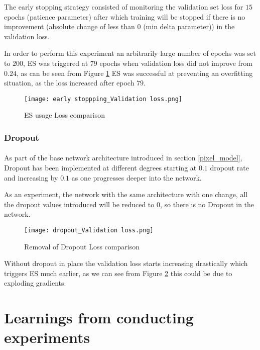 The early stopping strategy consisted of monitoring the validation set loss for $15$ epochs (patience parameter) after which training will be stopped if there is no improvement (absolute change of less than $0$ (min delta parameter)) in the validation loss.

In order to perform this experiment an arbitrarily large number of epochs was set to $200$, \gls{ES} was triggered at $79$ epochs when validation loss did not improve from $0.24$, as can be seen from Figure \ref{es_loss} \gls{ES} was successful at preventing an overfitting situation, as the loss increased after epoch $79$.

\begin{figure}[hbt!]
    \centering
    \texttt{[image: early stoppping\_Validation loss.png]}
    \caption{ES usage Loss comparison}
    \label{es_loss}
\end{figure}

\subsubsection{Dropout}
\paragraph{}
As part of the base network architecture introduced in section \ref{pixel_model}, Dropout has been implemented at different degrees starting at $0.1$ dropout rate and increasing by $0.1$ as one progresses deeper into the network.

As an experiment, the network with the same architecture with one change, all the dropout values introduced will be reduced to $0$, so there is no Dropout in the network.

\begin{figure}[hbt!]
    \centering
    \texttt{[image: dropout\_Validation loss.png]}
    \caption{Removal of Dropout Loss comparison}
    \label{dropout_loss}
\end{figure}

Without dropout in place the validation loss starts increasing drastically which triggers \gls{ES} much earlier, as we can see from Figure \ref{dropout_loss} this could be due to exploding gradients.

\section{Learnings from conducting experiments}
